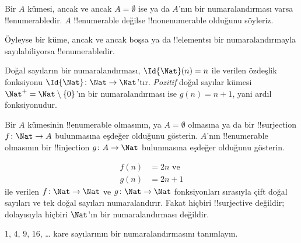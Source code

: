\begin{defn}
  Bir $A$ kümesi, ancak ve ancak $A=\emptyset$ ise ya da $A$'nın bir
  numaralandırması varsa !!{enumerable}{}dir. $A$ !!{enumerable} değilse
  !!{nonenumerable} olduğunu söyleriz.
\end{defn}

\begin{explain}
Öyleyse bir küme, ancak ve ancak boşsa ya da !!{element}s{}ı bir
numaralandırmayla sayılabiliyorsa !!{enumerable}{}dir.
\end{explain}

\begin{ex}
Doğal sayıların bir numaralandırması, $\Id{\Nat}(n)=n$ ile verilen özdeşlik
fonksiyonu $\Id{\Nat}\colon\Nat\to\Nat$'tır. \emph{Pozitif} doğal sayılar
kümesi $\Nat^+=\Nat\setminus\{0\}$'ın bir numaralandırması ise $g(n)=n+1$,
yani ardıl fonksiyonudur.
\end{ex}

\begin{prob}
Bir $A$ kümesinin !!{enumerable} olmasının, ya $A=\emptyset$ olmasına ya da
bir !!{surjection} $f\colon\Nat\to A$ bulunmasına eşdeğer olduğunu gösterin.
$A$'nın !!{enumerable} olmasının bir !!{injection} $g\colon A\to\Nat$
bulunmasına eşdeğer olduğunu gösterin.
\end{prob}

\begin{ex}
\begin{align*}
  f(n) & = 2n \text{ ve}\\
  g(n) & = 2n+1
\end{align*}
ile verilen $f\colon\Nat\to\Nat$ ve $g\colon\Nat\to\Nat$ fonksiyonları
sırasıyla çift doğal sayıları ve tek doğal sayıları numaralandırır. Fakat
hiçbiri !!{surjective} değildir; dolayısıyla hiçbiri $\Nat$'ın bir
numaralandırması değildir.
\end{ex}

\begin{prob}
$1$, $4$, $9$, $16$, \dots{} kare sayılarının bir numaralandırmasını
tanımlayın.
\end{prob}

